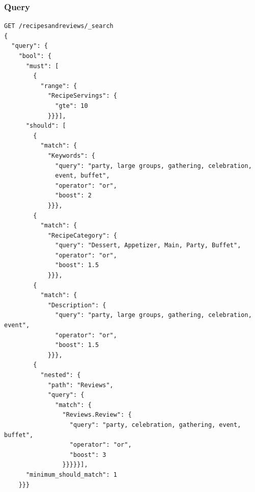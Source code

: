 \begin{enumerate}
    \subsubsection{Query}
    \begin{verbatim}
GET /recipesandreviews/_search
{
  "query": {
    "bool": {
      "must": [
        {
          "range": {
            "RecipeServings": {
              "gte": 10
            }}}],
      "should": [
        {
          "match": {
            "Keywords": {
              "query": "party, large groups, gathering, celebration, 
              event, buffet",
              "operator": "or",
              "boost": 2
            }}},
        {
          "match": {
            "RecipeCategory": {
              "query": "Dessert, Appetizer, Main, Party, Buffet",
              "operator": "or",
              "boost": 1.5
            }}},
        {
          "match": {
            "Description": {
              "query": "party, large groups, gathering, celebration, event",
              "operator": "or",
              "boost": 1.5
            }}},
        {
          "nested": {
            "path": "Reviews",
            "query": {
              "match": {
                "Reviews.Review": {
                  "query": "party, celebration, gathering, event, buffet",
                  "operator": "or",
                  "boost": 3
                }}}}}],
      "minimum_should_match": 1
    }}}
    \end{verbatim}


\end{enumerate}
